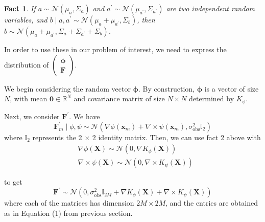 \documentclass[11pt,a4paper]{article}
\newcommand{\icol}[1]{%
  \left(\begin{smallmatrix}#1\end{smallmatrix}\right)%
}
\newtheorem{fact}{Fact}
\begin{document}
\begin{fact}
If $a \sim \mathcal{N}(\mu_a, \Sigma_a)$ and $a^{\prime} \sim \mathcal{N}(\mu_{a^{\prime}}, \Sigma_{a^{\prime}})$ are two independent random variables, and $b \mid a, a^{\prime} \sim \mathcal{N}(\mu_a + \mu_{a^{\prime}}, \Sigma_b)$, then $b \sim \mathcal{N}(\mu_a + \mu_{a^{\prime}}, \Sigma_a + \Sigma_{a^{\prime}} + \Sigma_b)$.
\end{fact}

In order to use these in our problem of interest, we need to express the distribution of $\icol{\bm{\phi} \\ \textbf{F}}$. 


We begin considering the random vector $\bm{\phi}$. By construction, $\bm{\phi}$ is a vector of size $N$, with mean $\textbf{0} \in \mathbb{R}^{N}$ and covariance matrix of size $N \times N$ determined by $K_{\phi}$. 

Next, we consider $\bm{F}^\prime$. We have 
$$
\textbf{F}^\prime_m
\mid \phi, \psi \sim \mathcal{N}\left(\nabla \phi (\textbf{x}_m) + \nabla \times \psi (\textbf{x}_m), \sigma^2_{\text{obs}} \mathbb{I}_2\right)
$$
where $\mathbb{I}_2$ represents the 2 $\times$ 2 identity matrix. 
Then, we can use fact 2 above with 
\begin{align*}
   &\nabla \phi (\textbf{X}) \sim \mathcal{N}(0, \nabla K_{\phi}(\textbf{X})) \\
   &\nabla \times \psi (\textbf{X}) \sim \mathcal{N}(0, \nabla \times K_{\psi}(\textbf{X}))
\end{align*}

to get
$$
\textbf{F}^\prime
\sim \mathcal{N}\left(0, \sigma_{\text{obs}}^2 \mathbb{I}_{2M} + \nabla K_{\phi}(\textbf{X}) + \nabla \times K_{\psi}(\textbf{X}) \right)
$$
where each of the matrices has dimension $2M \times 2M$, and the entries are obtained as in Equation (1) from previous section. \newline


\end{document}

